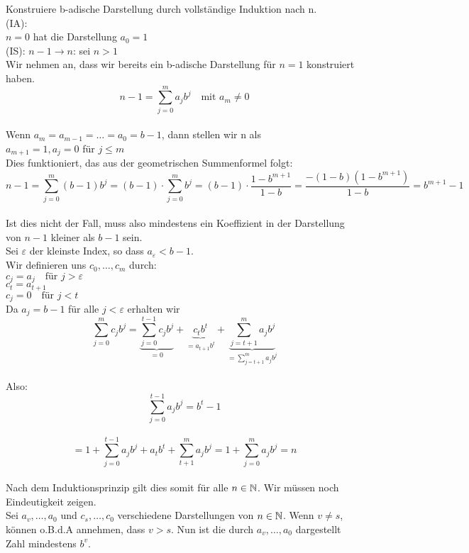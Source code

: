\documentclass[../ana1u.tex]{subfiles}
\begin{document}
\begin{bew}
    Konstruiere b-adische Darstellung durch vollständige Induktion nach n.\\
    (IA):\\
    \(n = 0\) hat die Darstellung \(a_0 = 1\)\\
    (IS): \(n - 1 \rightarrow n\): sei \(n > 1\)\\
    Wir nehmen an, dass wir bereits ein b-adische Darstellung für \(n = 1\) konstruiert haben.\\
    \[n-1 = \sum_{j=0}^{m} a_jb^j \quad \text{mit } a_m \neq 0\]\\
    Wenn \(a_m = a_{m-1} = \dots = a_0 = b-1\), dann stellen wir n als\\
    \(a_{m+1} = 1, a_j = 0\) für \(j \leq m\)\\
    Dies funktioniert, das aus der geometrischen Summenformel folgt:\\
    \[n-1 = \sum_{j=0}^{m} (b-1)b^j = (b-1) \cdot \sum_{j=0}^{m}b^j = (b-1) \cdot \frac{1- b^{m+1}}{1-b} = \frac{-(1-b)(1-b^{m+1})}{1-b} = b^{m+1}-1\]\\
    Ist dies nicht der Fall, muss also mindestens ein Koeffizient in der Darstellung von \(n-1\) kleiner als \(b-1\) sein.\\
    Sei \(\varepsilon\) der kleinste Index, so dass \(a_{\varepsilon} < b-1\).\\
    Wir definieren uns \(c_0, \dots, c_m\) durch:\\
    \(c_j = a_j \quad \text{für } j > \varepsilon\)\\
    \(c_t = a_{t+1}\)\\
    \(c_j = 0 \quad \text{für } j < t\)\\
    Da \(a_j = b-1\) für alle \(j<\varepsilon\) erhalten wir\\
    \[\sum_{j=0}^{m} c_jb^j = \underbrace{\sum_{j=0}^{t-1} c_jb^j}_{=0} + \underbrace{c_tb^t}_{=a_{t+1}b^t} + \underbrace{\sum_{j=t+1}^{m} a_jb^j}_{=\sum_{j=t+1}^{m} a_jb^j}\]\\
    Also:
    \[\sum_{j=0}^{t-1} a_jb^j = b^t-1\]\\
    \[= 1+\sum_{j=0}^{t-1} a_jb^j + a_tb^t + \sum_{t+1}^{m}a_jb^j = 1+\sum_{j=0}^{m} a_jb^j = n\]\\
    Nach dem Induktionsprinzip gilt dies somit für alle \(n \in \mathbb{N}\). Wir müssen noch Eindeutigkeit zeigen.\\
    Sei \(a_v,\dots, a_0\) und \(c_s,\dots, c_0\) verschiedene Darstellungen von \(n \in \mathbb{N}\). Wenn \(v \neq s\), können o.B.d.A annehmen, dass \(v > s\). Nun ist die durch \(a_v,\dots, a_0\) dargestellt Zahl mindestens \(b^v\).\\

\end{bew}
\end{document}
